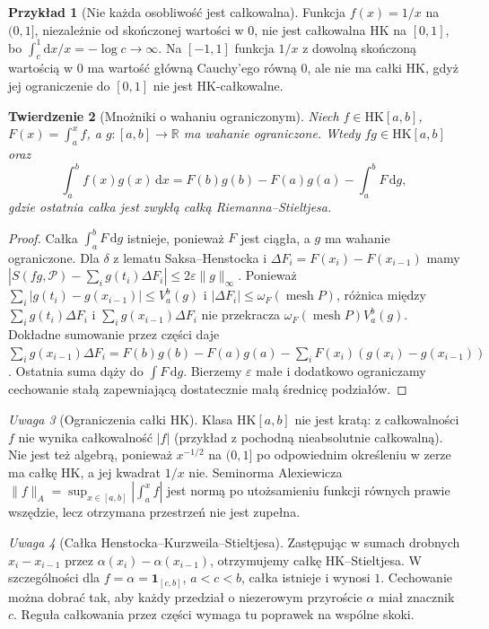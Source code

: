 \documentclass[11pt,a4paper]{article}
\numberwithin{equation}{section}
\theoremstyle{plain}
\newtheorem{twierdzenie}{Twierdzenie}[section]
\theoremstyle{definition}
\newtheorem{przyklad}[twierdzenie]{Przykład}
\theoremstyle{remark}
\newtheorem{uwaga}[twierdzenie]{Uwaga}
\newcommand{\R}{\mathbb R}
\newcommand{\ind}[1]{\mathbf 1_{#1}}
\newcommand{\mesh}{\operatorname{mesh}}
\newcommand{\HK}{\mathrm{HK}}
\begin{document}
\begin{przyklad}[Nie każda osobliwość jest całkowalna]
Funkcja $f(x)=1/x$ na $(0,1]$, niezależnie od skończonej wartości w $0$, nie jest całkowalna HK na $[0,1]$, bo $\int_c^1\mathrm dx/x=-\log c\to\infty$. Na $[-1,1]$ funkcja $1/x$ z dowolną skończoną wartością w $0$ ma wartość główną Cauchy'ego równą $0$, ale nie ma całki HK, gdyż jej ograniczenie do $[0,1]$ nie jest HK-całkowalne.
\end{przyklad}
\begin{twierdzenie}[Mnożniki o wahaniu ograniczonym]
Niech $f\in\HK[a,b]$, $F(x)=\int_a^x f$, a $g:[a,b]\to\R$ ma wahanie ograniczone. Wtedy $fg\in\HK[a,b]$ oraz
\[
\int_a^b f(x)g(x)\,\mathrm dx=F(b)g(b)-F(a)g(a)-\int_a^b F\,\mathrm dg,
\]
gdzie ostatnia całka jest zwykłą całką Riemanna--Stieltjesa.
\end{twierdzenie}
\begin{proof}
Całka $\int_a^b F\,\mathrm dg$ istnieje, ponieważ $F$ jest ciągła, a $g$ ma wahanie ograniczone. Dla $\delta$ z lematu Saksa--Henstocka i $\Delta F_i=F(x_i)-F(x_{i-1})$ mamy
$|S(fg,\mathcal P)-\sum_i g(t_i)\Delta F_i|\le2\varepsilon\|g\|_\infty$.
Ponieważ $\sum_i|g(t_i)-g(x_{i-1})|\le V_a^b(g)$ i $|\Delta F_i|\le\omega_F(\mesh P)$, różnica między $\sum_i g(t_i)\Delta F_i$ i $\sum_i g(x_{i-1})\Delta F_i$ nie przekracza $\omega_F(\mesh P)V_a^b(g)$. Dokładne sumowanie przez części daje
$\sum_i g(x_{i-1})\Delta F_i=F(b)g(b)-F(a)g(a)-\sum_iF(x_i)(g(x_i)-g(x_{i-1}))$.
Ostatnia suma dąży do $\int F\,\mathrm dg$. Bierzemy $\varepsilon$ małe i dodatkowo ograniczamy cechowanie stałą zapewniającą dostatecznie małą średnicę podziałów.
\end{proof}
\begin{uwaga}[Ograniczenia całki HK]
Klasa $\HK[a,b]$ nie jest kratą: z całkowalności $f$ nie wynika całkowalność $|f|$ (przykład z pochodną nieabsolutnie całkowalną). Nie jest też algebrą, ponieważ $x^{-1/2}$ na $(0,1]$ po odpowiednim określeniu w zerze ma całkę HK, a jej kwadrat $1/x$ nie. Seminorma Alexiewicza $\|f\|_A=\sup_{x\in[a,b]}\left|\int_a^x f\right|$ jest normą po utożsamieniu funkcji równych prawie wszędzie, lecz otrzymana przestrzeń nie jest zupełna.
\end{uwaga}
\begin{uwaga}[Całka Henstocka--Kurzweila--Stieltjesa]
Zastępując w sumach drobnych $x_i-x_{i-1}$ przez $\alpha(x_i)-\alpha(x_{i-1})$, otrzymujemy całkę HK--Stieltjesa. W szczególności dla $f=\alpha=\ind{[c,b]}$, $a<c<b$, całka istnieje i wynosi $1$. Cechowanie można dobrać tak, aby każdy przedział o niezerowym przyroście $\alpha$ miał znacznik $c$. Reguła całkowania przez części wymaga tu poprawek na wspólne skoki.
\end{uwaga}
\end{document}
